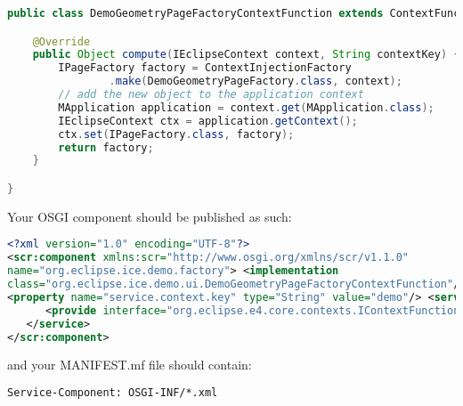\begin{lstlisting}[language=java]
public class DemoGeometryPageFactoryContextFunction extends ContextFunction {

    @Override
    public Object compute(IEclipseContext context, String contextKey) {
        IPageFactory factory = ContextInjectionFactory
                .make(DemoGeometryPageFactory.class, context);
        // add the new object to the application context
        MApplication application = context.get(MApplication.class);
        IEclipseContext ctx = application.getContext();
        ctx.set(IPageFactory.class, factory);
        return factory;
    }

}
\end{lstlisting}

Your OSGI component should be published as such:

\begin{lstlisting}[language=xml]
<?xml version="1.0" encoding="UTF-8"?>
<scr:component xmlns:scr="http://www.osgi.org/xmlns/scr/v1.1.0"
name="org.eclipse.ice.demo.factory"> <implementation
class="org.eclipse.ice.demo.ui.DemoGeometryPageFactoryContextFunction"/>
<property name="service.context.key" type="String" value="demo"/> <service>
      <provide interface="org.eclipse.e4.core.contexts.IContextFunction"/>
   </service>
</scr:component>
\end{lstlisting}

and your MANIFEST.mf file should contain:

\begin{lstlisting}[language=xml]
Service-Component: OSGI-INF/*.xml
\end{lstlisting}